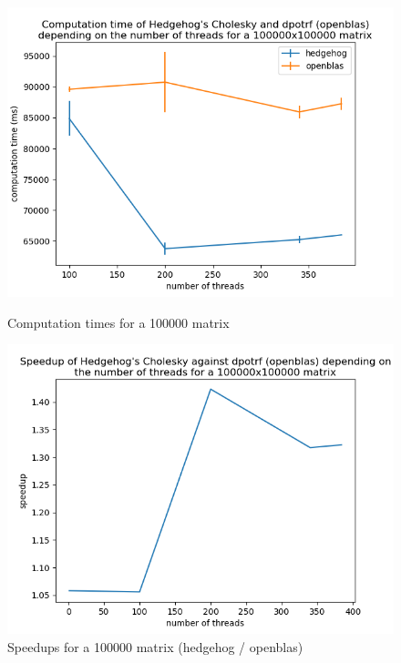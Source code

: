 \begin{figure}[!htb]
  \begin{minipage}{0.48\linewidth}
    \centering
    \includegraphics[scale=0.5]{img/cho-img/times-100000.png}
    \caption{Computation times for a 100000 matrix}
    \label{fig:time100000}
  \end{minipage}\hfill
  \begin{minipage}{0.48\linewidth}
    \centering
    \includegraphics[scale=0.5]{img/cho-img/speedup-100000.png}
    \caption{Speedups for a 100000 matrix (hedgehog / openblas)}
    \label{fig:speedups100000}
  \end{minipage}
\end{figure}

